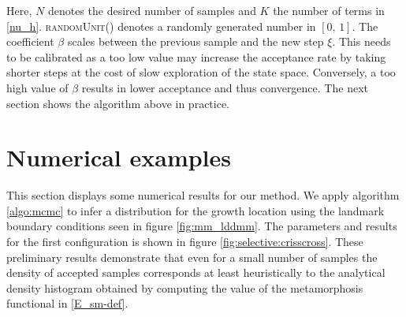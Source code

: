 \documentclass[runningheads]{llncs}
\begin{document}
Here, $N$ denotes the desired number
of samples and $K$ the number of terms in \eqref{nu_h}. \textsc{randomUnit()}
denotes a randomly generated number in $[0,\,1]$. The coefficient $\beta$ scales
between the previous sample and the new step $\xi$. This needs to be calibrated
as a too low value may increase the acceptance rate by taking shorter steps at
the cost of slow exploration of the state space. Conversely, a too high value of
$\beta$ results in lower acceptance and thus convergence. The next section shows
the algorithm above in practice.

\section{Numerical examples}\label{sec:numerical}

This section displays some numerical results for our method. We apply algorithm
\ref{algo:mcmc} to infer a distribution for the growth location using the
landmark boundary conditions seen in figure \ref{fig:mm_lddmm}.  The parameters
and results for the first configuration is shown in figure
\ref{fig:selective:crisscross}. These preliminary results demonstrate that even
for a small number of samples the density of accepted samples corresponds at
least heuristically to the analytical density histogram obtained by computing
the value of the metamorphosis functional in \eqref{E_sm-def}.
\end{document}
